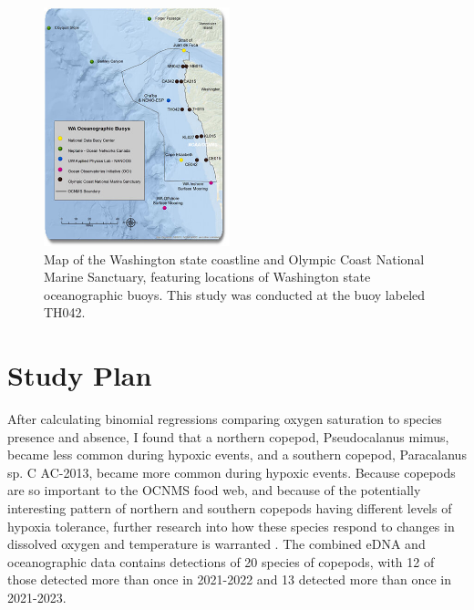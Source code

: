 \documentclass[12pt,twoside]{reedthesis}
\begin{document}
\begin{figure}
	\begin{center}
		\includegraphics[width=0.48\textwidth]{Fig_OCNMS_buoy_map}
		\caption[Map of oceanographic moorings in OCNMS]{\footnotesize{Map of the Washington state coastline and Olympic Coast National Marine Sanctuary, featuring locations of Washington state oceanographic buoys. This study was conducted at the buoy labeled TH042. }} %
		\label{OCNMSbuoys}
	\end{center}
\end{figure} 

\section{Study Plan}

After calculating binomial regressions comparing oxygen saturation to species presence and absence, I found that a northern copepod, Pseudocalanus mimus, became less common during hypoxic events, and a southern copepod, Paracalanus sp. C AC-2013, became more common during hypoxic events. Because copepods are so important to the OCNMS food web, and because of the potentially interesting pattern of northern and southern copepods having different levels of hypoxia tolerance, further research into how these species respond to changes in dissolved oxygen and temperature is warranted \autocite{NOAAFisheries2024}. The combined eDNA and oceanographic data contains detections of 20 species of copepods, with 12 of those detected more than once in 2021-2022 and 13 detected more than once in 2021-2023.
\end{document}
